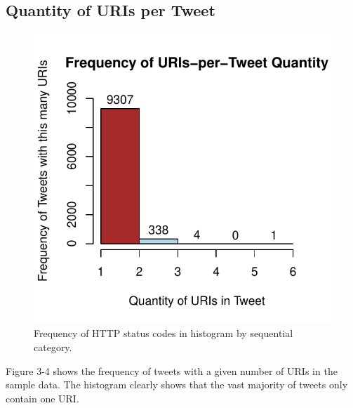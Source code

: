 \documentclass[a4paper,12pt]{article}
\begin{document}
\subsection{Quantity of URIs per Tweet}
\begin{figure}[H]
    \centering
    \includegraphics{stats/uris_per_tweet.pdf}
    \caption{Frequency of HTTP status codes in histogram by sequential category.}
\end{figure}
Figure 3-4 shows the frequency of tweets with a given number of URIs in the sample data. The
histogram clearly shows that the vast majority of tweets only contain one URI.
\end{document}
